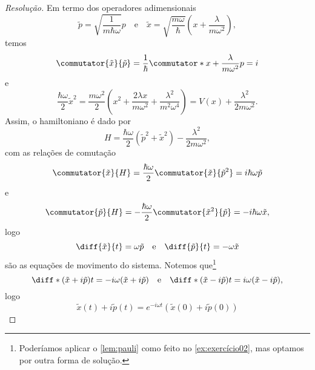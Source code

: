 \begin{proof}[Resolução]
    Em termo dos operadores adimensionais
    \begin{equation*}
        \tilde{p} = \sqrt{\frac{1}{m \hbar \omega}} p
        \quad\text{e}\quad
        \tilde{x} = \sqrt{\frac{m \omega}{\hbar}} \left(x + \frac{\lambda}{m \omega^2}\right),
    \end{equation*}
    temos
    \begin{equation*}
        \commutator{\tilde{x}}{\tilde{p}} = \frac{1}{\hbar} \commutator*{x + \frac{\lambda}{m \omega^2}}{p} = i
    \end{equation*}
    e
    \begin{equation*}
        \frac{\hbar \omega}{2}\tilde{x}^2 = \frac{m \omega^2}{2} \left(x^2 + \frac{2\lambda x}{m \omega^2}+ \frac{\lambda^2}{m^2 \omega^4}\right) = V(x) + \frac{\lambda^2}{2 m \omega^2}.
    \end{equation*}
    Assim, o hamiltoniano é dado por
    \begin{equation*}
        H = \frac{\hbar \omega}{2} \left(\tilde{p}^2 + \tilde{x}^2\right) - \frac{\lambda^2}{2m \omega^2},
    \end{equation*}
    com as relações de comutação
    \begin{equation*}
        \commutator{\tilde{x}}{H} = \frac{\hbar \omega}{2} \commutator{\tilde{x}}{\tilde{p}^2} = i \hbar \omega \tilde{p}
    \end{equation*}
    e
    \begin{equation*}
        \commutator{\tilde{p}}{H} = -\frac{\hbar \omega}{2} \commutator{\tilde{x}^2}{\tilde{p}} = - i\hbar \omega \tilde{x},
    \end{equation*}
    logo
    \begin{equation*}
        \diff{\tilde{x}}{t} = \omega \tilde{p}\quad\text{e}\quad\diff{\tilde{p}}{t} = - \omega \tilde{x}
    \end{equation*}
    são as equações de movimento do sistema. Notemos que\footnote{Poderíamos aplicar o \cref{lem:pauli} como feito no \cref{ex:exercício02}, mas optamos por outra forma de solução.}
    \begin{equation*}
        \diff*{(\tilde{x} + i\tilde{p})}{t} = -i\omega(\tilde{x} + i \tilde{p})\quad\text{e}\quad
        \diff*{(\tilde{x} - i\tilde{p})}{t} = i\omega(\tilde{x} - i \tilde{p}),
    \end{equation*}
    logo
    \begin{equation*}
        \tilde{x}(t) + i \tilde{p}(t) = e^{-i \omega t} \left(\tilde{x}(0) + i \tilde{p}(0)\right)

\end{equation*}
\end{proof}
